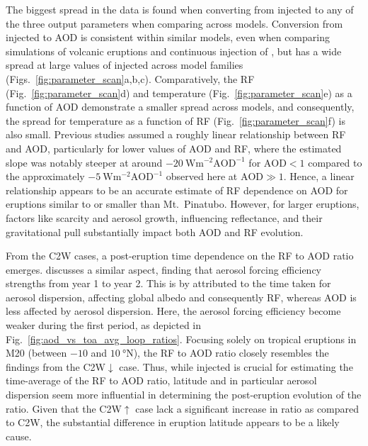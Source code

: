 \documentclass[draft]{agujournal2019}
\newcommand{\iso}[1][i]{{#1}njected \ce{SO2}}
\newcommand{\cwm}{C2W\(\downarrow\)}
\newcommand{\cwsn}{C2W\(\uparrow\)}
\begin{document}
The biggest spread in the data is found when converting from \iso{} to any of the three
output parameters when comparing across models. Conversion from \iso{} to AOD is
consistent within similar models, even when comparing simulations of volcanic eruptions
\cite{timmreck2010} and continuous injection of  \cite{niemeier2015}, but has a
wide spread at large values of \iso{} across model families
(Figs.~\ref{fig:parameter_scan}a,b,c). Comparatively, the RF
(Fig.~\ref{fig:parameter_scan}d) and temperature (Fig.~\ref{fig:parameter_scan}e) as a
function of AOD demonstrate a smaller spread across models, and consequently, the spread
for temperature as a function of RF (Fig.~\ref{fig:parameter_scan}f) is also small.
Previous studies assumed a roughly linear relationship between RF and AOD, particularly
for lower values of AOD and RF, where the estimated slope was notably steeper at around
\(\SI{-20}{\watt\metre^{-2}\mathrm{AOD}^{-1}}\) for \(\mathrm{AOD}<1\) compared to the
approximately \(\SI{-5}{\watt\metre^{-2}\mathrm{AOD}^{-1}}\) observed here at
\(\mathrm{AOD}\gg1\). Hence, a linear relationship appears to be an accurate estimate of
RF dependence on AOD for eruptions similar to or smaller than Mt.\ Pinatubo. However,
for larger eruptions, factors like  scarcity and aerosol growth, influencing
reflectance, and their gravitational pull substantially impact both AOD and RF
evolution.

From the C2W cases, a post-eruption time dependence on the RF to AOD ratio emerges.
 discusses a similar aspect, finding that aerosol forcing efficiency
strengths from year 1 to year 2. This is by  attributed to the time
taken for aerosol dispersion, affecting global albedo and consequently RF, whereas AOD
is less affected by aerosol dispersion. Here, the aerosol forcing efficiency become
weaker during the first period, as depicted in
Fig.~\ref{fig:aod_vs_toa_avg_loop_ratios}. Focusing solely on tropical eruptions in M20
(between \(-10\) and \(\SI{10}{\degree\mathrm{N}}\)), the RF to AOD ratio closely
resembles the findings from the \cwm{} case. Thus, while \iso{} is crucial for
estimating the time-average of the RF to AOD ratio, latitude and in particular aerosol
dispersion seem more influential in determining the post-eruption evolution of the
ratio. Given that the \cwsn{} case lack a significant increase in ratio as compared to
C2W, the substantial difference in eruption latitude appears to be a likely cause.
\end{document}
